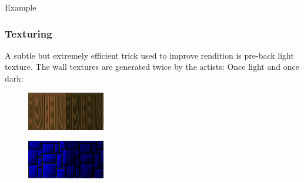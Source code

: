 Example























\subsubsection{Texturing}
A subtle but extremely efficient trick used to improve rendition is pre-back light texture. The wall textures are generated twice by the artists: Once light and once dark:\\
  \begin{figure}[H]
\centering
 \includegraphics[width=\textwidth]{imgs/baked_lights_wood.png}
 \end{figure}
\par
  \begin{figure}[H]
\centering
 \includegraphics[width=\textwidth]{imgs/baked_lights_stone.png}
 \end{figure}
